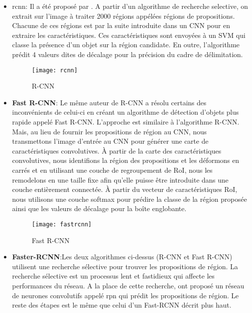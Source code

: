        \begin{itemize}
            \item \acrfull{rcnn}: Il a été proposé par \citeauthor{rcnn}. A partir d’un algorithme de recherche selective, on extrait sur l’image à traiter 2000 régions appélées régions de propositions. Chacune de ces régions est par la suite introduite dans un CNN pour en extraire les caractéristiques. Ces caractéristiques sont envoyées à un SVM qui classe la présence d’un objet sur la région candidate. En outre, l’algorithme prédit 4 valeurs dites de décalage pour la précision du cadre de délimitation.
                \begin{figure}[H]
                    \centering
                    \texttt{[image: rcnn]}
                    \caption{R-CNN}
                \end{figure}
            \item \textbf{Fast R-CNN}: Le même auteur de R-CNN a résolu certains des inconvénients de celui-ci en créant un algorithme de détection d'objets plus rapide appelé Fast R-CNN. L'approche est similaire à l'algorithme R-CNN. Mais, au lieu de fournir les propositions de région au CNN, nous transmettons l'image d'entrée au CNN pour générer une carte de caractéristiques convolutives. À partir de la carte des caractéristiques convolutives, nous identifions la région des propositions et les déformons en carrés et en utilisant une couche de regroupement de RoI, nous les remodelons en une taille fixe afin qu'elle puisse être introduite dans une couche entièrement connectée. À partir du vecteur de caractéristiques RoI, nous utilisons une couche softmax pour prédire la classe de la région proposée ainsi que les valeurs de décalage pour la boîte englobante.
                \begin{figure}[H]
                    \centering
                    \texttt{[image: fastrcnn]}
                    \caption{Fast R-CNN}
                \end{figure}
            \item \textbf{Faster-RCNN}:Les deux algorithmes ci-dessus (R-CNN et Fast R-CNN) utilisent une recherche sélective pour trouver les propositions de région. La recherche sélective est un processus lent et fastidieux qui affecte les performances du réseau. A la place de cette recherche, \citeauthor{rcnnfaster} ont proposé un réseau de neurones convolutifs appelé \acrfull{rpn} qui prédit les propositions de région. Le reste des étapes est le même que celui d'un Fast-RCNN décrit plus haut.

\end{itemize}
